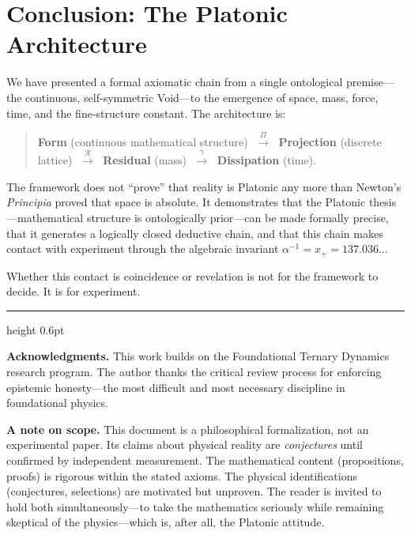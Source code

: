 \documentclass[11pt,twoside]{article}
\theoremstyle{definition}
\theoremstyle{plain}
\theoremstyle{remark}
\begin{document}
\section{Conclusion: The Platonic Architecture}

We have presented a formal axiomatic chain from a single ontological premise---the continuous, self-symmetric Void---to the emergence of space, mass, force, time, and the fine-structure constant. The architecture is:

\begin{quote}
\textbf{Form} (continuous mathematical structure) $\;\xrightarrow{\;\Pi\;}\;$ \textbf{Projection} (discrete lattice) $\;\xrightarrow{\;\mathcal{R}\;}\;$ \textbf{Residual} (mass) $\;\xrightarrow{\;\gamma\;}\;$ \textbf{Dissipation} (time).
\end{quote}

The framework does not ``prove'' that reality is Platonic any more than Newton's \emph{Principia} proved that space is absolute. It demonstrates that the Platonic thesis---mathematical structure is ontologically prior---can be made formally precise, that it generates a logically closed deductive chain, and that this chain makes contact with experiment through the algebraic invariant $\alpha^{-1} = x_+ = 137.036\ldots$

Whether this contact is coincidence or revelation is not for the framework to decide. It is for experiment.

\vspace{2em}
\hrule height 0.6pt
\vspace{1em}

\small
\noindent\textbf{Acknowledgments.} This work builds on the Foundational Ternary Dynamics research program. The author thanks the critical review process for enforcing epistemic honesty---the most difficult and most necessary discipline in foundational physics.

\vspace{1em}
\noindent\textbf{A note on scope.} This document is a philosophical formalization, not an experimental paper. Its claims about physical reality are \emph{conjectures} until confirmed by independent measurement. The mathematical content (propositions, proofs) is rigorous within the stated axioms. The physical identifications (conjectures, selections) are motivated but unproven. The reader is invited to hold both simultaneously---to take the mathematics seriously while remaining skeptical of the physics---which is, after all, the Platonic attitude.
\end{document}
